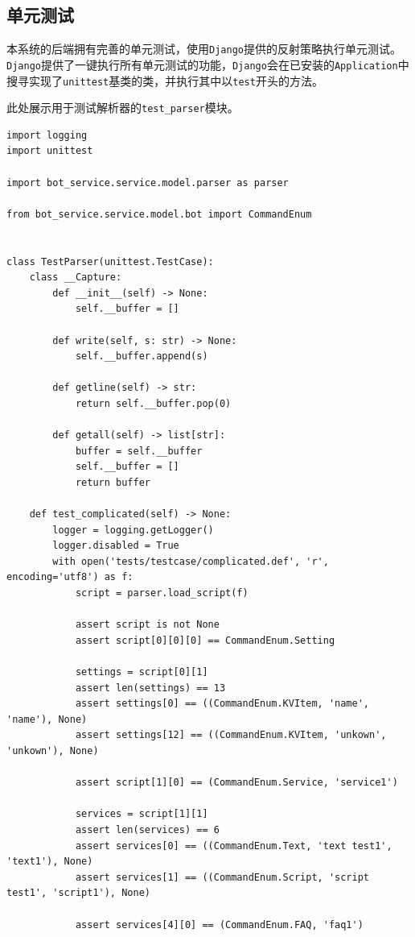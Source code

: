 \documentclass[hyperref]{ctexart}
\begin{document}
\subsection{单元测试}
本系统的后端拥有完善的单元测试，使用\texttt{Django}提供的反射策略执行单元测试。
\texttt{Django}提供了一键执行所有单元测试的功能，\texttt{Django}会在已安装的\texttt{Application}中搜寻实现了\texttt{unittest}基类的类，并执行其中以\texttt{test}开头的方法。
\par 此处展示用于测试解析器的\texttt{test\_parser}模块。
\lstset{
    language=python
}
\begin{lstlisting}
import logging
import unittest

import bot_service.service.model.parser as parser

from bot_service.service.model.bot import CommandEnum


class TestParser(unittest.TestCase):
    class __Capture:
        def __init__(self) -> None:
            self.__buffer = []
        
        def write(self, s: str) -> None:
            self.__buffer.append(s)
        
        def getline(self) -> str:
            return self.__buffer.pop(0)
        
        def getall(self) -> list[str]:
            buffer = self.__buffer
            self.__buffer = []
            return buffer

    def test_complicated(self) -> None:
        logger = logging.getLogger()
        logger.disabled = True
        with open('tests/testcase/complicated.def', 'r', encoding='utf8') as f:
            script = parser.load_script(f)
            
            assert script is not None
            assert script[0][0][0] == CommandEnum.Setting

            settings = script[0][1]
            assert len(settings) == 13
            assert settings[0] == ((CommandEnum.KVItem, 'name', 'name'), None)
            assert settings[12] == ((CommandEnum.KVItem, 'unkown', 'unkown'), None)
            
            assert script[1][0] == (CommandEnum.Service, 'service1')
            
            services = script[1][1]
            assert len(services) == 6
            assert services[0] == ((CommandEnum.Text, 'text test1', 'text1'), None)
            assert services[1] == ((CommandEnum.Script, 'script test1', 'script1'), None)

            assert services[4][0] == (CommandEnum.FAQ, 'faq1')
            

\end{lstlisting}
\end{document}
